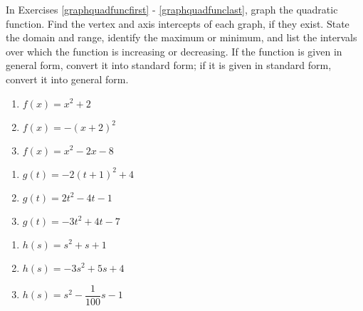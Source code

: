 \documentclass{ximera}
\begin{document}
	\author{Stitz-Zeager}


In Exercises \ref{graphquadfuncfirst} - \ref{graphquadfunclast}, graph the quadratic function.  Find the vertex and axis intercepts of each graph, if they exist.  State the domain and range, identify the maximum or minimum, and list the intervals over which the function is increasing or decreasing.  If the function is given in general form, convert it into standard form; if it is given in standard form, convert it into general form.  

\begin{multicols}{3}
\begin{enumerate}

\item $f(x) = x^{2} + 2$ \label{graphquadfuncfirst}
\item $f(x) = -(x + 2)^{2}$
\item $f(x) = x^{2} - 2x - 8$

\setcounter{HW}{\value{enumi}}
\end{enumerate}
\end{multicols}

\begin{multicols}{3}
\begin{enumerate}
\setcounter{enumi}{\value{HW}}

\item $g(t) = -2(t + 1)^{2} + 4$
\item $g(t) = 2t^2 - 4t - 1$
\item $g(t) = -3t^{2} + 4t - 7$

\setcounter{HW}{\value{enumi}}
\end{enumerate}
\end{multicols}

\begin{multicols}{3}
\begin{enumerate}
\setcounter{enumi}{\value{HW}}

\item  $h(s) = s^2 + s + 1$

\item  $h(s)  = -3s^2+5s+4$

\item $h(s) = s^{2} - \dfrac{1}{100} s - 1$ \label{graphquadfunclast}

\setcounter{HW}{\value{enumi}}
\end{enumerate}
\end{multicols}
\end{document}
